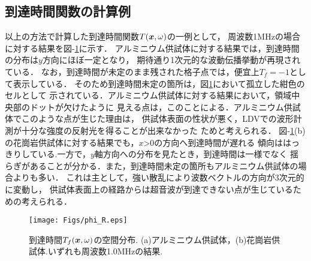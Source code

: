 \subsection{到達時間関数の計算例}
以上の方法で計算した到達時間関数$T(\mbox{\boldmath{$x$}},\omega)$の一例として，
周波数1MHzの場合に対する結果を図-\ref{fig:fig10}に示す． 
アルミニウム供試体に対する結果では，到達時間の分布は$y$方向にほぼ一定となり，
期待通り1次元的な波動伝播挙動が再現されている．
なお，到達時間が未定のまま残された格子点では，便宜上$T_f=-1$として表示している．
そのため到達時間未定の箇所は，図\ref{fig:fig10}において孤立した紺色のセルとして
示されている．アルミニウム供試体に対する結果において，領域中央部のドットが欠けたように
見える点は，このことによる．アルミニウム供試体でこのような点が生じた理由は，
供試体表面の性状が悪く，LDVでの波形計測が十分な強度の反射光を得ることが出来なかった
ためと考えられる．
図-\ref{fig:fig10}(b)の花崗岩供試体に対する結果でも，$x$>0の方向へ到達時間が遅れる
傾向ははっきりしている.一方で，$y$軸方向への分布を見たとき，到達時間は一様でなく
揺らぎがあることが分かる．また，到達時間未定の箇所もアルミニウム供試体の場合よりも多い．
これは主として，強い散乱により波数ベクトルの方向が3次元的に変動し，
供試体表面上の経路からは超音波が到達できない点が生じているための考えられる．
\begin{figure}
\begin{center}
	\texttt{[image: Figs/phi\_R.eps]}
	\caption{到達時間$T_f(\mbox{\boldmath{$x$}},\omega)$の空間分布. 
	(a)アルミニウム供試体，(b)花崗岩供試体.いずれも周波数1.0MHzの結果.}
	\label{fig:fig10}
\end{center}
\end{figure}
